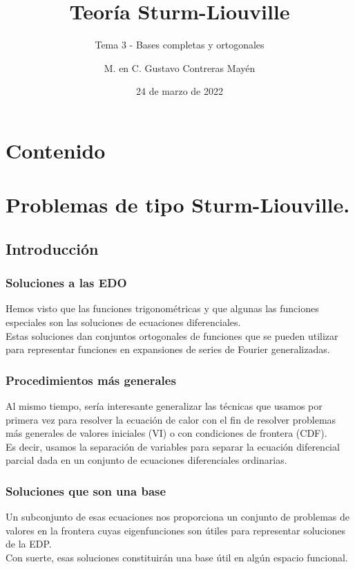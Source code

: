 \documentclass[12pt]{beamer}
\date{24 de marzo de 2022}
\title{\large{Teoría Sturm-Liouville}}
\subtitle{Tema 3 - Bases completas y ortogonales}
\author{M. en C. Gustavo Contreras Mayén}
\begin{document}
\maketitle
\fontsize{14}{14}\selectfont
{}

\section*{Contenido}


\section{Problemas de tipo Sturm-Liouville.}
\subsection{Introducción}

\begin{frame}
\frametitle{Soluciones a las EDO}
Hemos visto que las funciones trigonométricas y que algunas las funciones especiales son las soluciones de ecuaciones diferenciales.
\\
\bigskip
\pause
Estas soluciones dan conjuntos ortogonales de funciones que se pueden utilizar para representar funciones en expansiones de series de Fourier generalizadas.
\end{frame}
\begin{frame}
\frametitle{Procedimientos más generales}
Al mismo tiempo, sería interesante generalizar las técnicas que usamos por primera vez para resolver la ecuación de calor con el fin de resolver problemas más generales de valores iniciales (VI) o con condiciones de frontera (CDF).
\\
\bigskip
\pause
 Es decir, usamos la separación de variables para separar la ecuación diferencial parcial dada en un conjunto de ecuaciones diferenciales ordinarias.
\end{frame}
\begin{frame}
\frametitle{Soluciones que son una base}
Un subconjunto de esas ecuaciones nos proporciona un conjunto de problemas de valores en la frontera cuyas eigenfunciones son útiles para representar soluciones de la EDP.
\\
\bigskip
\pause
Con suerte, esas soluciones constituirán una base útil en algún espacio funcional.
\end{frame}
\end{document}
